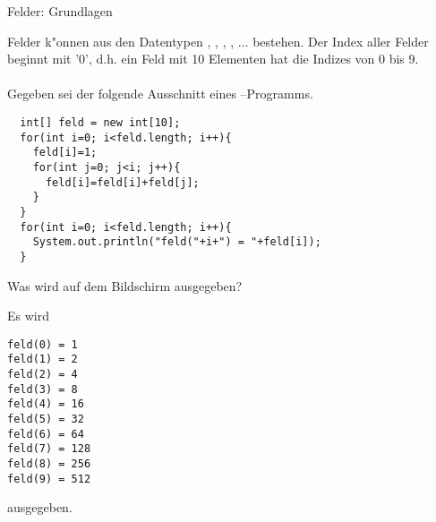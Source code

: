 \begin{exercise}{Felder: Grundlagen}
\begin{body}
Felder k"onnen aus den Datentypen , , , , $\ldots$ bestehen.
Der Index aller Felder beginnt mit '0', d.h. ein Feld mit 10 Elementen hat die Indizes von 0 bis 9.
\\\\
Gegeben sei der folgende Ausschnitt eines --Programms.
\begin{verbatim}
  int[] feld = new int[10];
  for(int i=0; i<feld.length; i++){
    feld[i]=1;
    for(int j=0; j<i; j++){
      feld[i]=feld[i]+feld[j];
    }
  }
  for(int i=0; i<feld.length; i++){
    System.out.println("feld("+i+") = "+feld[i]);
  }
\end{verbatim}
Was wird auf dem Bildschirm ausgegeben?
\end{body}

\begin{solution}
Es wird
\begin{verbatim}
feld(0) = 1
feld(1) = 2
feld(2) = 4
feld(3) = 8
feld(4) = 16
feld(5) = 32
feld(6) = 64
feld(7) = 128
feld(8) = 256
feld(9) = 512
\end{verbatim}
ausgegeben.
\end{solution}

\end{exercise}
